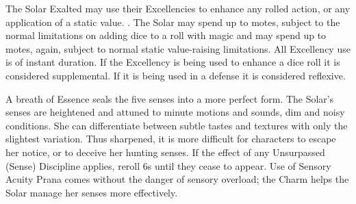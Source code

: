 



The Solar Exalted may use their Excellencies to enhance any rolled action, or
any application of a static value. . The Solar may
spend up to  motes, subject to the normal
limitations on adding dice to a roll with magic \parencite*[p.~251]{ex3}
 and may
spend up to  motes, again, subject to normal static value-raising
limitations. All Excellency use is of instant duration. If the Excellency is
being used to enhance a dice roll it is considered supplemental. If it is being
used in a defense it is considered reflexive.





A breath of Essence seals the five senses into a more perfect form. The Solar's
senses are heightened and attuned to minute motions and sounds, dim and noisy
conditions. She can differentiate between subtle tastes and textures with only
the slightest variation. Thus sharpened, it is more difficult for characters to
escape her notice, or to deceive her hunting senses.  If the effect of
any Unsurpassed (Sense) Discipline applies, reroll 6s until they cease to
appear. Use of Sensory Acuity Prana comes without the danger of sensory
overload; the Charm helps the Solar manage her senses more effectively.



